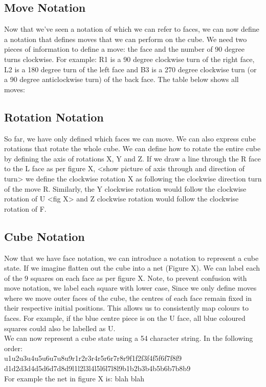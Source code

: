 \documentclass[titlepage]{report}[12pt]
\begin{document}
\subsection{Move Notation}
Now that we've seen a notation of which we can refer to faces, we can now define a notation that defines moves that we can perform on the cube. We need two pieces of information to define a move: the face and the number of 90 degree turns clockwise.  For example: R1 is a 90 degree clockwise turn of the right face, L2 is a 180 degree turn of the left face and B3 is a 270 degree clockwise turn (or a 90 degree anticlockwise turn) of the back face. The table below shows all moves:

\subsection{Rotation Notation}
So far, we have only defined which faces we can move. We can also express cube rotations that rotate the whole cube. We can define how to rotate the entire cube by defining the axis of rotations X, Y and Z. If we draw a line through the R face to the L face as per figure X, <show picture of axis through and direction of turn> we define the clockwise rotation X as following the clockwise direction turn of the move R. Similarly, the Y clockwise rotation would follow the clockwise rotation of U <fig X> and Z clockwise rotation would follow the clockwise rotation of F. 

\subsection{Cube Notation}
Now that we have face notation, we can introduce a notation to represent a cube state. If we imagine flatten out the cube into a net (Figure X). We can label each of the 9 squares on each face as per figure X. Note, to prevent confusion with move notation, we label each square with lower case, Since we only define moves where we move outer faces of the cube, the centres of each face remain fixed in their respective initial positions. This allows us to consistently map colours to faces. For example, if the blue centre piece is on the U face, all blue coloured squares could also be labelled as U. 
\\
\indent We can now represent a cube state using a 54 character string. In the following order: 
\\
u1u2u3u4u5u6u7u8u9r1r2r3r4r5r6r7r8r9f1f2f3f4f5f6f7f8f9\\d1d2d3d4d5d6d7d8d9l1l2l3l4l5l6l7l8l9b1b2b3b4b5b6b7b8b9
\\
For example the net in figure X is: blah blah
\end{document}

